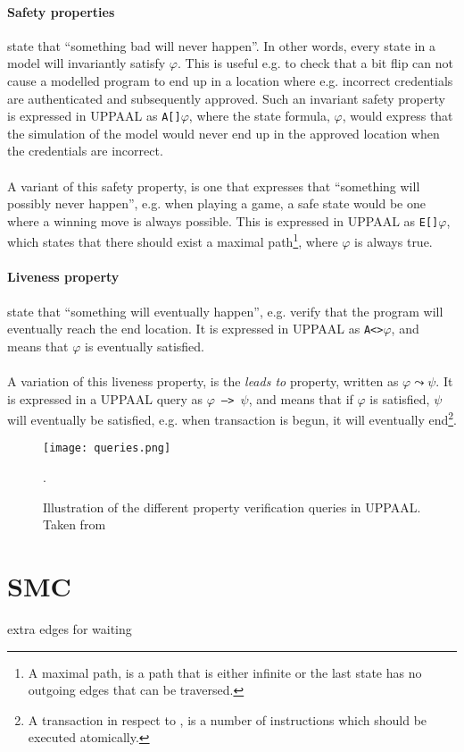 \paragraph{Safety properties} state that ``something bad will never happen''. In other words, every state in a model will invariantly satisfy $\varphi$. This is useful e.g. to check that a bit flip can not cause a modelled program to end up in a location where e.g. incorrect credentials are authenticated and subsequently approved. Such an invariant safety property is expressed in UPPAAL as \texttt{A[]$\varphi$}, where the state formula, $\varphi$, would express that the simulation of the model would never end up in the approved location when the credentials are incorrect.\\\\
A variant of this safety property, is one that expresses that ``something will possibly never happen'', e.g. when playing a game, a safe state would be one where a winning move is always possible. This is expressed in UPPAAL as \texttt{E[]$\varphi$}, which states that there should exist a maximal path\footnote{A maximal path, is a path that is either infinite or the last state has no outgoing edges that can be traversed.}, where $\varphi$ is always true.
\paragraph{Liveness property} state that ``something will eventually happen'', e.g. verify that the program will eventually reach the end location. It is expressed in UPPAAL as \texttt{A<>$\varphi$}, and means that $\varphi$ is eventually satisfied.\\\\
A variation of this liveness property, is the \textit{leads to} property, written as $\varphi \leadsto \psi$. It is expressed in a UPPAAL query as \texttt{$\varphi$ --> $\psi$}, and means that if $\varphi$ is satisfied, $\psi$ will eventually be satisfied, e.g. when \jc transaction is begun, it will eventually end\footnote{A transaction in respect to \jc, is a number of instructions which should be executed atomically.}.

\begin{figure}[H]
\centering
\texttt{[image: queries.png]}
\caption{Illustration of the different property verification queries in UPPAAL. Taken from \cite[p. 8]{upptut}}.
\label{fig:query}
\end{figure}

\section{SMC}
extra edges for waiting